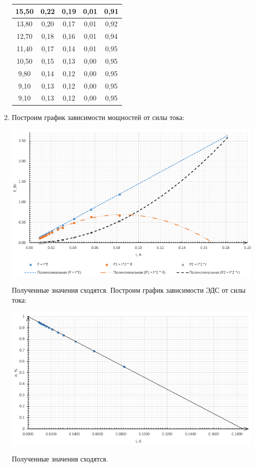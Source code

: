 \documentclass[12pt]{article}
\begin{document}
\begin{enumerate}
\begin{table}[h!]
\begin{center}
\begin{tabular}{|c|c|c|c|c|}
\hline
15,50 & 0,22 & 0,19 & 0,01 & 0,91\\
\hline
13,80 & 0,20 & 0,17 & 0,01 & 0,92\\
\hline
12,70 & 0,18 & 0,16 & 0,01 & 0,94\\
\hline
11,40 & 0,17 & 0,14 & 0,01 & 0,95\\
\hline
10,50 & 0,15 & 0,13 & 0,00 & 0,95\\
\hline
9,80 & 0,14 & 0,12 & 0,00 & 0,95\\
\hline
9,10 & 0,13 & 0,12 & 0,00 & 0,95\\
\hline
9,10 & 0,13 & 0,12 & 0,00 & 0,95\\
\hline
\end{tabular}
\end{center}
\end{table}
\item Построим график зависимости мощностей от силы тока:
\begin{center}
\includegraphics{graph2}
\end{center}
Полученные значения сходятся.
Построим график зависимости ЭДС от силы тока:
\begin{center}
\includegraphics{graph3}
\end{center}
Полученные значения сходятся.

\end{enumerate}
\end{document}
